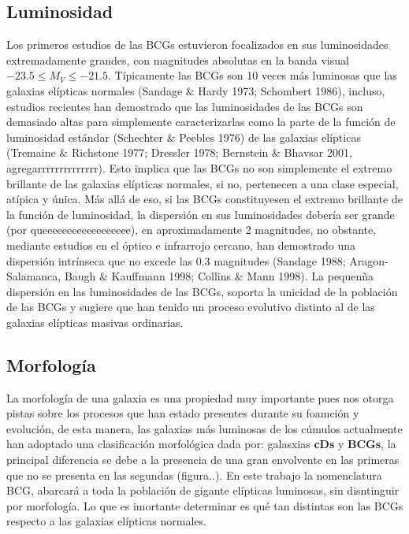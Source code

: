 \subsection{Luminosidad}
Los primeros estudios de las BCGs estuvieron focalizados en sus luminosidades extremadamente
grandes, con magnitudes absolutas en la banda visual $ -23.5 \leq M_{V} \leq -21.5$. T\'ipicamente
las BCGs son 10 veces m\'as luminosas que las galaxias el\'ipticas normales (Sandage $\&$ Hardy 1973;
Schombert 1986), incluso, estudios recientes han demostrado que las luminosidades de las
BCGs son demasiado altas para simplemente caracterizarlas como la parte de la funci\'on de luminosidad est\'andar
(Schechter $\&$ Peebles 1976) de las galaxias el\'ipticas (Tremaine
$\&$ Richstone 1977; Dressler 1978; Bernstein $\&$ Bhavsar 2001, agregarrrrrrrrrrrrrr). Esto implica que 
las BCGs no son simplemente el extremo brillante de las galaxias el\'ipticas normales, si no, pertenecen 
a una clase especial, at\'ipica  y \'unica.
M\'as all\'a de eso, si las BCGs constituyesen el extremo brillante de la funci\'on de luminosidad, la
dispersi\'on en sus luminosidades deber\'ia ser grande (por queeeeeeeeeeeeeeeeee), en aproximadamente 2 magnitudes,
no obstante, mediante estudios en el \'optico e infrarrojo cercano, han demostrado una dispersi\'on intr\'inseca
que no excede las 0.3 magnitudes (Sandage 1988; Aragon-Salamanca, Baugh $\&$ Kauffmann 1998; Collins $\&$ Mann 1998).
La pequen\~na dispersi\'on en las luminosidades de las BCGs, soporta la unicidad de la poblaci\'on
de las BCGs y sugiere que han tenido un proceso evolutivo distinto al de las galaxias el\'ipticas masivas ordinarias.
\subsection{Morfolog\'ia}
La morfolog\'ia de una galaxia es una propiedad muy importante
pues nos otorga pistas sobre los procesos que han estado presentes
durante su foamci\'on y evoluci\'on, de esta manera, las galaxias
m\'as luminosas de los c\'umulos actualmente han adoptado una clasificaci\'on
morfol\'ogica dada por: galasxias \textbf{cDs} y \textbf{BCGs}, la principal
diferencia se debe a la presencia de una gran envolvente en las primeras
que no se presenta en las segundas (figura..). En este trabajo la nomenclatura BCG, abarcar\'a
a toda la poblaci\'on de gigante el\'ipticas luminosas, sin disntinguir por morfolog\'ia.
Lo que es imortante determinar es qu\'e tan distintas son las BCGs respecto a las
galaxias el\'ipticas normales.

